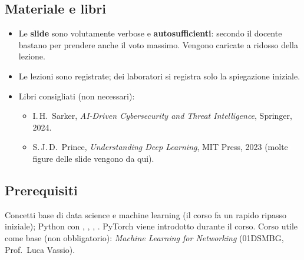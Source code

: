 \subsection{Materiale e libri}
\begin{itemize}
  \item Le \textbf{slide} sono volutamente verbose e \textbf{autosufficienti}: secondo il docente
        bastano per prendere anche il voto massimo. Vengono caricate a ridosso della lezione.
  \item Le lezioni sono registrate; dei laboratori si registra solo la spiegazione iniziale.
  \item Libri consigliati (non necessari):
  \begin{itemize}
    \item I.\,H.\ Sarker, \emph{AI-Driven Cybersecurity and Threat Intelligence}, Springer, 2024.
    \item S.\,J.\,D.\ Prince, \emph{Understanding Deep Learning}, MIT Press, 2023 (molte figure
          delle slide vengono da qui).
  \end{itemize}
\end{itemize}

\subsection{Prerequisiti}
Concetti base di data science e machine learning (il corso fa un rapido ripasso iniziale);
Python con , , , . PyTorch viene
introdotto durante il corso. Corso utile come base (non obbligatorio):
\emph{Machine Learning for Networking} (01DSMBG, Prof.\ Luca Vassio).

